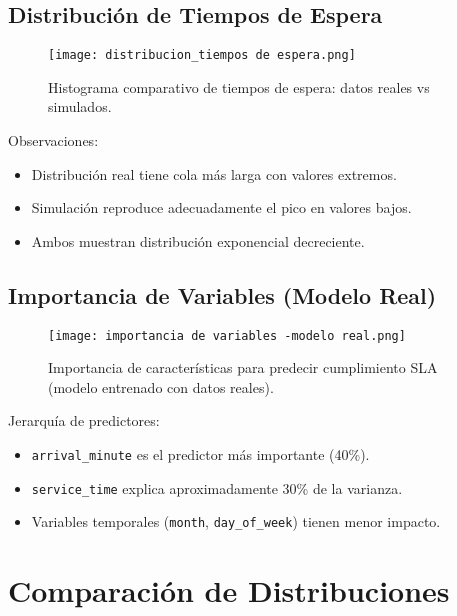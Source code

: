 \documentclass[12pt]{article}
\begin{document}
\subsection{Distribución de Tiempos de Espera}
\begin{figure}[H]
  \centering
  \texttt{[image: distribucion\_tiempos de espera.png]}
  \caption{Histograma comparativo de tiempos de espera: datos reales vs simulados.}
\end{figure}
\noindent
Observaciones:
\begin{itemize}
  \item Distribución real tiene cola más larga con valores extremos.
  \item Simulación reproduce adecuadamente el pico en valores bajos.
  \item Ambos muestran distribución exponencial decreciente.
\end{itemize}

\subsection{Importancia de Variables (Modelo Real)}
\begin{figure}[H]
  \centering
  \texttt{[image: importancia de variables -modelo real.png]}
  \caption{Importancia de características para predecir cumplimiento SLA (modelo entrenado con datos reales).}
\end{figure}
\noindent
Jerarquía de predictores:
\begin{itemize}
  \item \texttt{arrival\_minute} es el predictor más importante (40\%).
  \item \texttt{service\_time} explica aproximadamente 30\% de la varianza.
  \item Variables temporales (\texttt{month}, \texttt{day\_of\_week}) tienen menor impacto.
\end{itemize}

\newpage
\section{Comparación de Distribuciones}
\end{document}
